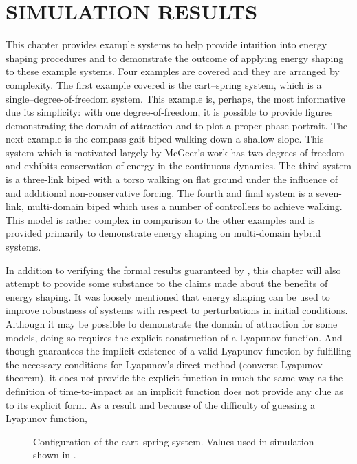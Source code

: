 \chapter{\uppercase{Simulation Results}} \label{chap:simulations}

This chapter provides example systems to help provide intuition into energy
shaping procedures and to demonstrate the outcome of applying energy shaping to
these example systems.
% 
Four examples are covered and they are arranged by complexity.
% 
The first example covered is the cart--spring system, which is a
single--degree-of-freedom system.
% 
This example is, perhaps, the most informative due its simplicity:
% 
with one degree-of-freedom, it is possible to provide figures demonstrating the
domain of attraction and to plot a proper phase portrait.
% 
The next example is the compass-gait biped walking down a shallow slope.
% 
This system which is motivated largely by McGeer's work \cite{McGeer1990} has
two degrees-of-freedom and exhibits conservation of energy in the continuous
dynamics.
% 
The third system is a three-link biped with a torso walking on flat ground under
the influence of \cs \cite{Spong2005} and additional
non-conservative forcing.
% 
The fourth and final system is a seven-link, multi-domain biped which uses a
number of controllers to achieve walking.
% 
This model is rather complex in comparison to the other examples and is provided
primarily to demonstrate energy shaping on multi-domain hybrid systems.

In addition to verifying the formal results guaranteed by
, this chapter will also attempt to provide some
substance to the claims made about the benefits of energy shaping.
% 
It was loosely mentioned that energy shaping can be used to improve robustness
of systems with respect to perturbations in initial conditions.
% 
Although it may be possible to demonstrate the domain of attraction for some
models, doing so requires the explicit construction of a Lyapunov function.
% 
And though  guarantees the implicit existence of a
valid Lyapunov function by fulfilling the necessary conditions for Lyapunov's
direct method (converse Lyapunov theorem), it does not provide the explicit
function in much the same way as the definition of time-to-impact as an implicit
function does not provide any clue as to its explicit form.
% 
As a result and because of the difficulty of guessing a Lyapunov function, 




\begin{figure}[t!]
  \centering
  \def\svgwidth{0.7\columnwidth}
  
  \caption[Configuration of the cart--spring system.]{Configuration of the
    cart--spring system. Values used in simulation shown in .}
  \label{fig:cart-spring-configuration}
\end{figure}

